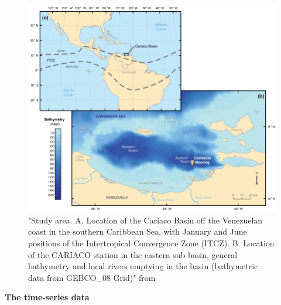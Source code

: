 \begin{figure}
\centering
\includegraphics[trim = 0mm 0mm 0mm 0mm, clip, width=1.\linewidth]{./Chp1-Intro/CARIACObasinMAP_Bringueetal2018.png}
\caption[Scheme]{\small {"Study area. A. Location of the Cariaco Basin off the Venezuelan coast in the southern Caribbean Sea, with January and June positions of the Intertropical Convergence Zone (ITCZ). B. Location of the CARIACO station in the eastern sub-basin, general bathymetry and local rivers emptying in the basin (bathymetric data from GEBCO\_08 Grid)" from \cite{Bringue2019}}} %
\label{CARIACO-map}
\end{figure}



{\textbf{The time-series data}}

